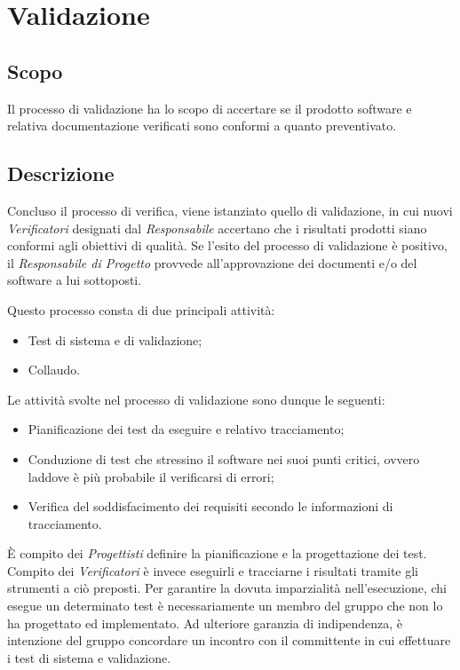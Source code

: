 \documentclass[../NormediProgetto.tex]{subfiles}
\begin{document}

\section{Validazione}

\subsection{Scopo}
Il processo di validazione ha lo scopo di accertare se il prodotto software e relativa documentazione verificati sono conformi a quanto preventivato.

\subsection{Descrizione}
Concluso il processo di verifica, viene istanziato quello di validazione, in cui nuovi \textit{Verificatori} designati dal \textit{Responsabile} accertano che i risultati prodotti siano conformi agli obiettivi di qualità. Se l'esito del processo di validazione è positivo, il \textit{Responsabile di Progetto} provvede all'approvazione dei documenti e/o del software a lui sottoposti.

\noindent Questo processo consta di due principali attività:
\begin{itemize}
    \item Test di sistema e di validazione;
    \item Collaudo.
\end{itemize}

\noindent Le attività svolte nel processo di validazione sono dunque le seguenti:

\begin{itemize}
    \item Pianificazione dei test da eseguire e relativo tracciamento;
    
    \item Conduzione di test che stressino il software nei suoi punti critici, ovvero laddove è più probabile il verificarsi di errori;
    
    \item Verifica del soddisfacimento dei requisiti secondo le informazioni di tracciamento.
\end{itemize}

È compito dei \textit{Progettisti} definire la pianificazione e la progettazione dei test. Compito dei \textit{Verificatori} è invece eseguirli e tracciarne i risultati tramite gli strumenti a ciò preposti. Per garantire la dovuta imparzialità nell'esecuzione, chi esegue un determinato test è necessariamente un membro del gruppo che non lo ha progettato ed implementato. Ad ulteriore garanzia di indipendenza, è intenzione del gruppo concordare un incontro con il committente in cui effettuare i test di sistema e validazione.
\end{document}

